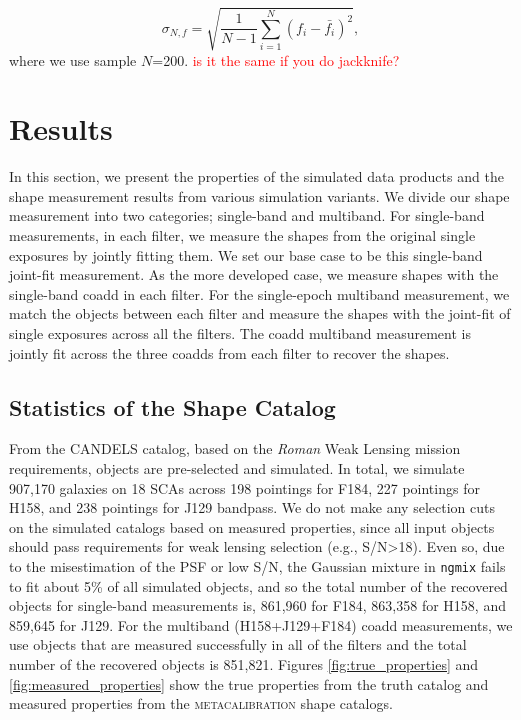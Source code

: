 \documentclass[fleqn,usenatbib]{mnras}
\begin{document}
\begin{equation}
    \sigma_{N,f} = \sqrt{\frac{1}{N-1} \sum_{i=1}^{N}(f_{i}-\bar{f_{i}})^{2}}, 
\end{equation}
where we use sample $N$=200.  \textcolor{red}{is it the same if you do jackknife?}


\section{Results}
\label{sec:results}
In this section, we present the properties of the simulated data products and the shape measurement results from various simulation variants. We divide our shape measurement into two categories; single-band and multiband. For single-band measurements, in each filter, we measure the shapes from the original single exposures by jointly fitting them. We set our base case to be this single-band joint-fit measurement. As the more developed case, we measure shapes with the single-band coadd in each filter. For the single-epoch multiband measurement, we match the objects between each filter and measure the shapes with the joint-fit of single exposures across all the filters. The coadd multiband measurement is jointly fit across the three coadds from each filter to recover the shapes. 

\subsection{Statistics of the Shape Catalog}
From the CANDELS catalog, based on the \emph{Roman} Weak Lensing mission requirements, objects are pre-selected and simulated. In total, we simulate 907,170 galaxies on 18 SCAs across 198 pointings for F184, 227 pointings for H158, and 238 pointings for J129 bandpass. We do not make any selection cuts on the simulated catalogs based on measured properties, since all input objects should pass requirements for weak lensing selection (e.g., S/N>18). Even so, due to the misestimation of the PSF or low S/N, the Gaussian mixture in \texttt{ngmix} fails to fit about 5\% of all simulated objects, and so the total number of the recovered objects for single-band measurements is, 861,960 for F184, 863,358 for H158, and 859,645 for J129. For the multiband (H158+J129+F184) coadd measurements, we use objects that are measured successfully in all of the filters and the total number of the recovered objects is 851,821.
Figures \ref{fig:true_properties} and \ref{fig:measured_properties} show the true properties from the truth catalog and measured properties from the \textsc{metacalibration} shape catalogs. 
\end{document}
